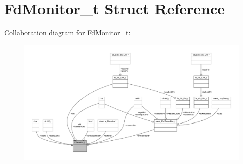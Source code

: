 \hypertarget{struct_fd_monitor__t}{}\section{Fd\+Monitor\+\_\+t Struct Reference}
\label{struct_fd_monitor__t}


Collaboration diagram for Fd\+Monitor\+\_\+t\+:
\nopagebreak
\begin{figure}[H]
\begin{center}
\leavevmode
\includegraphics[width=350pt]{struct_fd_monitor__t__coll__graph}
\end{center}
\end{figure}
